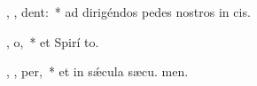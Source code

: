 \item {} ,   ,     dent:~* ad dirigéndos pedes nostros in  cis.
\item {} ,  o,~* et Spirí to.
\item {}   ,  ,  per,~* et in sǽcula sæcu. men.
